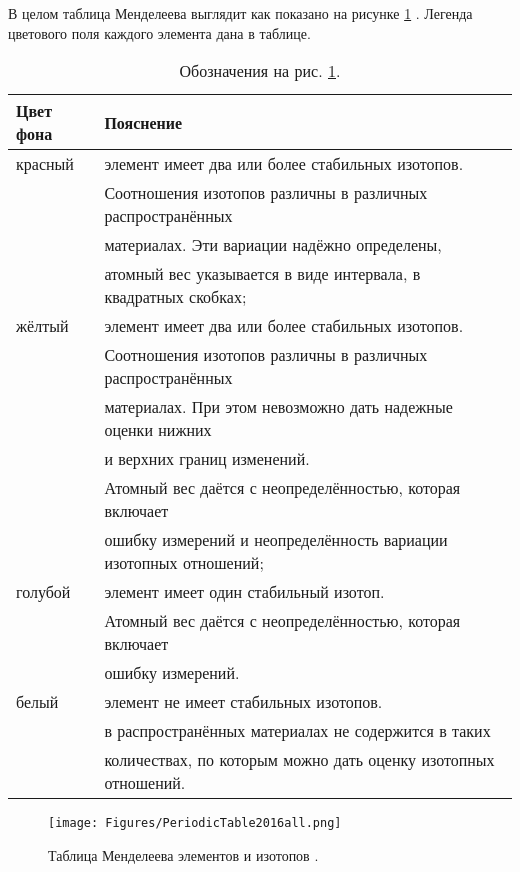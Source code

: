 \documentclass[a5paper,openany]{book}
\begin{document}
В целом таблица Менделеева выглядит как показано на рисунке \ref{f:PeriodicTable} \cite{IUPAC}.
Легенда цветового поля каждого элемента дана в таблице.\\
\begin{table}
{\footnotesize 
\begin{tabular}{ll}
	Цвет фона & Пояснение \\
	\hline	
	красный & элемент имеет два или более стабильных изотопов. \\
	~ &	Соотношения изотопов различны в различных распространённых  \\
	~ & материалах. Эти вариации надёжно определены, \\
	~ &  атомный вес указывается в виде интервала, в квадратных скобках; \\
	\hline
	жёлтый & элемент имеет два или более стабильных изотопов. \\
	~ & Соотношения изотопов различны в различных распространённых  \\
	~ & материалах. При этом невозможно дать надежные оценки нижних  \\
	~& и верхних границ изменений. \\
	~ & Атомный вес даётся с неопределённостью, которая включает  \\
	~ & ошибку измерений и неопределённость вариации изотопных отношений; \\
	\hline
	голубой& элемент имеет один стабильный изотоп.  \\
	~ & Атомный вес даётся с неопределённостью, которая включает\\ 
	~ & ошибку измерений. \\
	\hline	
	белый & элемент не имеет стабильных изотопов.	\\
	~ & в распространённых материалах не содержится в таких  \\
	~ & количествах, по которым можно дать оценку изотопных отношений.\\
	\hline
\end{tabular} 
\caption{Обозначения на рис. \ref{f:PeriodicTable}.}
}
\end{table}

\begin{figure}[ht] 
	\centering\small
	\unitlength=1mm
	\texttt{[image: Figures/PeriodicTable2016all.png]} 
	\caption{Таблица Менделеева элементов и изотопов \cite{IUPAC}.} 
	\label{f:PeriodicTable}
\end{figure}

\end{document}

